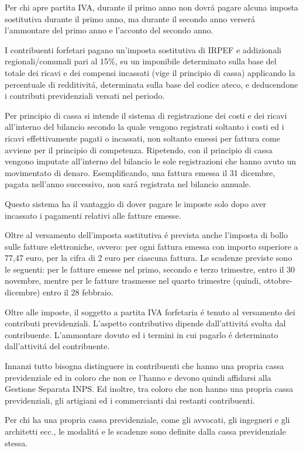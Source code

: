 \documentclass{article}
\begin{document}
Per chi apre partita IVA, durante il primo anno non dovr\'a pagare alcuna imposta sostitutiva durante il primo anno, 
ma durante il secondo anno verser\'a l'ammontare del primo anno e l'acconto del secondo anno.

I contribuenti forfetari pagano un'imposta sostitutiva di IRPEF e addizionali regionali/comunali pari al 15\%, su un imponibile determinato sulla base del totale dei ricavi e dei compensi incassati (vige il principio di cassa) applicando la percentuale di redditivit\'a,
determinata sulla base del codice ateco, e deducendone i contributi previdenziali versati nel periodo.

Per principio di cassa si intende il sistema di registrazione dei costi e dei ricavi all'interno del bilancio secondo la quale vengono registrati soltanto i costi ed i ricavi effettivamente pagati o incassati, non soltanto emessi per fattura come avviene per il principio di competenza.
Ripetendo, con il principio di cassa vengono imputate all'interno del bilancio le sole registrazioni che hanno avuto un movimentato di denaro. Esemplificando, una fattura emessa il 31 dicembre, pagata nell'anno successivo, non sar\'a registrata nel bilancio annuale.

Questo sistema ha il vantaggio di dover pagare le imposte solo dopo aver incassato i pagamenti relativi alle fatture emesse.

Oltre al versamento dell'imposta sostitutiva \'e prevista anche l'imposta di bollo sulle fatture elettroniche, ovvero:
per ogni fattura emessa con importo superiore a 77,47 euro, per la cifra di 2 euro per ciascuna fattura. Le scadenze previste sono le seguenti:
per le fatture emesse nel primo, secondo e terzo trimestre, entro il 30 novembre, mentre per le fatture trasmesse nel quarto trimestre (quindi, ottobre-dicembre) entro il 28 febbraio. 

Oltre alle imposte, il soggetto a partita IVA forfetaria \'e tenuto al versamento dei contributi previdenziali.
L'aspetto contributivo dipende dall'attivit\'a svolta dal contribuente.
L'ammontare dovuto ed i termini in cui pagarlo \'e determinato dall'attivit\'a del contribuente.

Innanzi tutto bisogna distinguere in contribuenti che hanno una propria cassa previdenziale ed in coloro che non ce l'hanno e devono quindi affidarsi alla Gestione Separata INPS.
Ed inoltre, tra coloro che non hanno una propria cassa previdenziali, gli artigiani ed i commercianti dai restanti contribuenti. 

Per chi ha una propria cassa previdenziale, come gli avvocati, gli ingegneri e gli architetti ecc., le modalit\'a e le scadenze sono definite dalla cassa previdenziale stessa. 
\end{document}
